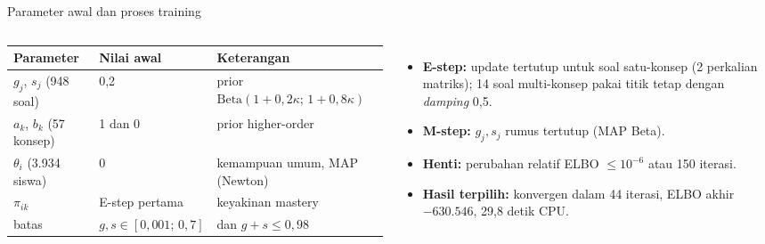 \documentclass[aspectratio=169,10pt]{beamer}
\begin{document}
\begin{frame}{Parameter awal dan proses training}
  \centering
  \resizebox{0.9\linewidth}{!}{}
  \vspace{0.3em}

  \begin{columns}[T]
    \scriptsize
    \begin{tabularx}{\linewidth}{@{}l l L@{}}
      \toprule
      Parameter & Nilai awal & Keterangan \\
      \midrule
      $g_j$, $s_j$ (948 soal) & 0,2 & prior $\mathrm{Beta}(1{+}0{,}2\kappa;\,1{+}0{,}8\kappa)$ \\
      $a_k$, $b_k$ (57 konsep) & 1 dan 0 & prior higher-order \\
      $\theta_i$ (3.934 siswa) & 0 & kemampuan umum, MAP (Newton) \\
      $\pi_{ik}$ & E-step pertama & keyakinan mastery \\
      batas & $g,s\in[0{,}001;\,0{,}7]$ & dan $g+s\le0{,}98$ \\
      \bottomrule
    \end{tabularx}
    \footnotesize
    \begin{itemize}
      \item \textbf{E-step:} update tertutup untuk soal satu-konsep (2 perkalian matriks); 14 soal multi-konsep pakai titik tetap dengan \emph{damping} 0,5.
      \item \textbf{M-step:} $g_j, s_j$ rumus tertutup (MAP Beta).
      \item \textbf{Henti:} perubahan relatif ELBO $\le10^{-6}$ atau 150 iterasi.
      \item \textbf{Hasil terpilih:} konvergen dalam \alert{44 iterasi}, ELBO akhir $-630.546$, \alert{29,8 detik} CPU.
    \end{itemize}
  \end{columns}
\end{frame}
\end{document}
